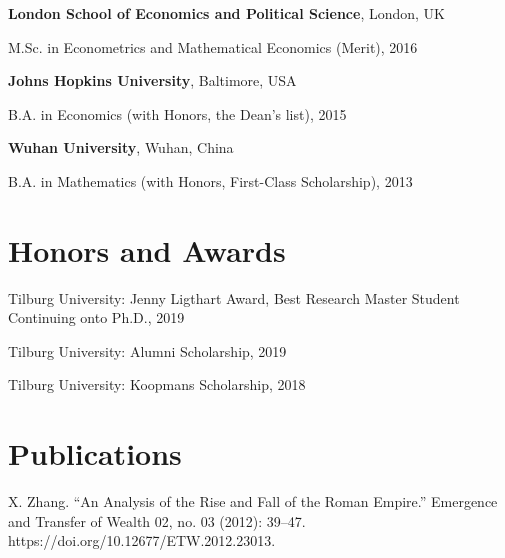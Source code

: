 \documentclass[margin,line]{res}
\newenvironment{list1}{
  \begin{list}{\ding{113}}{%
      \setlength{\itemsep}{0in}
      \setlength{\parsep}{0in} \setlength{\parskip}{0in}
      \setlength{\topsep}{0in} \setlength{\partopsep}{0in} 
      \setlength{\leftmargin}{0.17in}}}{\end{list}}
\begin{document}
\begin{resume}
{\bf London School of Economics and Political Science}, London, UK\\
\vspace*{-.1in}
\begin{list1}
\item[] M.Sc. in Econometrics and Mathematical Economics (Merit), 2016
\end{list1}

{\bf Johns Hopkins University}, Baltimore, USA\\
\vspace*{-.1in}
\begin{list1}
\item[] B.A. in Economics (with Honors, the Dean's list),  2015
\end{list1}

{\bf Wuhan University}, Wuhan, China\\
\vspace*{-.1in}
\begin{list1}
\item[] B.A. in Mathematics (with Honors, First-Class Scholarship),  2013
\end{list1}

\section{\sc Honors and Awards} 
Tilburg University: Jenny Ligthart Award, Best Research Master Student Continuing onto Ph.D., 2019

\vspace*{-2.5mm}
Tilburg University: Alumni Scholarship, 2019

\vspace*{-2.5mm}
Tilburg University: Koopmans Scholarship, 2018

%
%
%

\section{\sc Publications}
X. Zhang. ``An Analysis of the Rise and Fall of the Roman Empire.'' Emergence and Transfer of Wealth 02, no. 03 (2012): 39–47.
https://doi.org/10.12677/ETW.2012.23013.


\end{resume}
\end{document}
